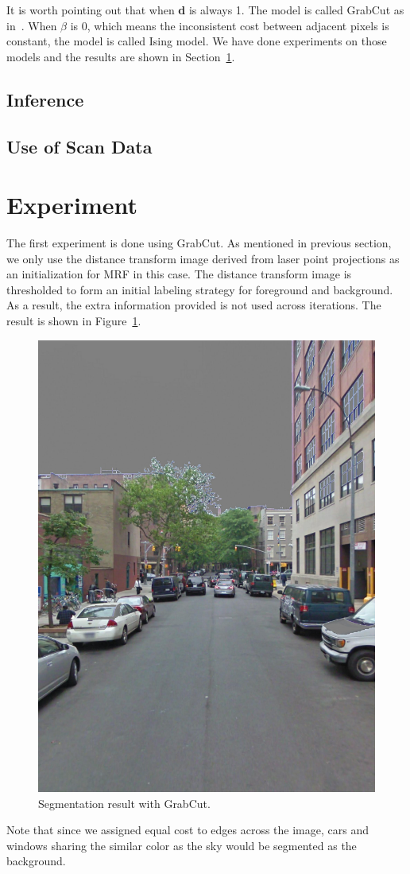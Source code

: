 \documentclass{article} %
\begin{document}
It is worth pointing out that when \textbf{d} is always 1. The model is
called GrabCut as in~\citep{Rother2004GrabCut}. When $\beta$ is 0,
which means the inconsistent cost between adjacent pixels is constant,
the model is called Ising model. We have done experiments on those
models and the results are shown in Section~\ref{sec:exp}.

\subsection{Inference}

\subsection{Use of Scan Data}

\section{Experiment}
\label{sec:exp}

The first experiment is done using GrabCut. As mentioned in previous section, we only use the distance transform image derived from laser point projections as an initialization for MRF in this case. The distance transform image is thresholded to form an initial labeling strategy for foreground and background. As a result, the extra information provided is not used across iterations. The result is shown in Figure~\ref{fig-grab-00_00}. 

\begin{figure}[h]
\begin{center}
\includegraphics[height=0.5\linewidth]{./fig/overlay_00_00_grab.jpg}
\end{center}
\caption{Segmentation result with GrabCut.}
\label{fig-grab-00_00}
\end{figure}

Note that since we assigned equal cost to edges across the image, cars and windows sharing the similar color as the sky would be segmented as the background.
\end{document}
